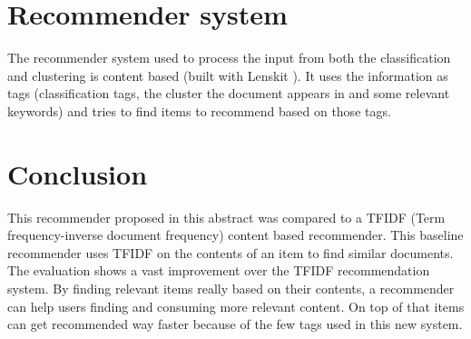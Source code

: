 \documentclass[twocolumn,twoside,a4paper]{phdsymp} %
\begin{document}
\section{Recommender system}
The recommender system used to process the input from both the classification and clustering is content based (built with Lenskit \cite{Ekstrand2011}). It uses the information as tags (classification tags, the cluster the document appears in and some relevant keywords) and tries to find items to recommend based on those tags. 

\section{Conclusion}
This recommender proposed in this abstract was compared to a TFIDF (Term frequency-inverse document frequency) content based recommender. This baseline recommender uses TFIDF on the contents of an item to find similar documents. The evaluation shows a vast improvement over the TFIDF recommendation system. By finding relevant items really based on their contents, a recommender can help users finding and consuming more relevant content. On top of that items can get recommended way faster because of the few tags used in this new system. 


{}  %
\end{document}
